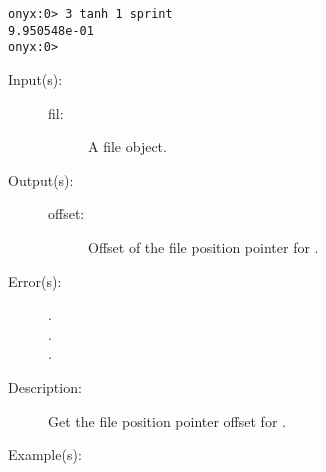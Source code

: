 \begin{description}
\begin{description}
\begin{verbatim}
onyx:0> 3 tanh 1 sprint
9.950548e-01
onyx:0>
		\end{verbatim}
 	\end{description}
\label{systemdict:tell}
\item[{\onyxop{file}{tell}{offset}}: ]
	\begin{description}\item[]
	\item[Input(s): ]
		\begin{description}\item[]
		\item[fil: ]
			A file object.
		\end{description}
	\item[Output(s): ]
		\begin{description}\item[]
		\item[offset: ]
			Offset of the file position pointer for .
		\end{description}
	\item[Error(s): ]
		\begin{description}\item[]
		\item[.]
		\item[.]
		\item[.]
		\end{description}
	\item[Description: ]
		Get the file position pointer offset for .
	\item[Example(s): ]\begin{verbatim}


\end{verbatim}
\end{description}
\end{description}
